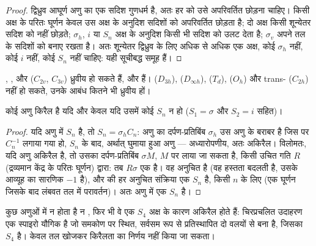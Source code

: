 \begin{proof}
द्विध्रुव आघूर्ण अणु का एक सदिश गुणधर्म है, अतः हर  को उसे अपरिवर्तित छोड़ना चाहिए। किसी अक्ष के परितः घूर्णन केवल उस अक्ष के
अनुदिश सदिशों को अपरिवर्तित छोड़ता है; दो अक्ष किसी शून्येतर सदिश को नहीं छोड़ते;
$\sigma_h$, $i$ या $S_n$ अक्ष के अनुदिश किसी भी सदिश को उलट देता है; $\sigma_v$
अपने तल के सदिशों को बनाए रखता है। अतः शून्येतर द्विध्रुव के लिए अधिक से अधिक एक
अक्ष, कोई $\sigma_h$ नहीं, कोई $i$ नहीं, कोई $S_n$ नहीं चाहिए: यही सूचीबद्ध समूह हैं।
\end{proof}

\begin{example}[ध्रुवीय या नहीं]\label{ex:b3:point-groups:polar}
, ,  और  ($C_{2v}$, $C_{3v}$) ध्रुवीय हो सकते हैं, और
हैं।  ($D_{3h}$),  ($D_{\infty h}$),  ($T_d$),  ($O_h$)
और trans- ($C_{2h}$) नहीं हो सकते, उनके आबंध कितने भी ध्रुवीय हों।
\end{example}

\begin{theorem}[किरैल अणु]\label{thm:b3:point-groups:chiral}
कोई अणु किरैल है यदि और केवल यदि उसमें कोई  $S_n$ न हो
($S_1 = \sigma$ और $S_2 = i$ सहित)।
\end{theorem}

\begin{proof}
यदि अणु में $S_n$ है, तो $S_n = \sigma_hC_n$: अणु का दर्पण-प्रतिबिंब $\sigma_h$
उस अणु के बराबर है जिस पर $C_n^{-1}$ लगाया गया हो, $S_n$ के बाद, अर्थात्
घुमाया हुआ अणु --- अध्यारोपणीय, अतः अकिरैल। विलोमतः, यदि
अणु अकिरैल है, तो उसका दर्पण-प्रतिबिंब $\sigma M$, $M$ पर लाया जा सकता है, किसी
उचित गति $R$ (द्रव्यमान केंद्र के परितः घूर्णन) द्वारा: तब $R\sigma$ एक
 है। वह अनुचित है (वह हस्तता बदलती है, उसके आव्यूह का
सारणिक $-1$ है), और  की हर अनुचित संक्रिया एक
$S_n$ है, किसी $n$ के लिए (एक घूर्णन जिसके बाद लंबवत तल में
परावर्तन)। अतः अणु में एक $S_n$ है।
\end{proof}

\begin{example}[दर्पण तल रहित एक अकिरैल अणु]\label{ex:b3:point-groups:s4}
कुछ अणुओं में न  होता है न , फिर भी
वे एक $S_4$ अक्ष के कारण अकिरैल होते हैं: चिरप्रचलित उदाहरण एक स्पाइरो यौगिक है
जो समकोण पर स्थित, सर्वसम रूप से प्रतिस्थापित दो वलयों से बना है, जिसका  $S_4$ है। केवल तल खोजकर किरैलता का निर्णय नहीं किया जा सकता।
\end{example}

